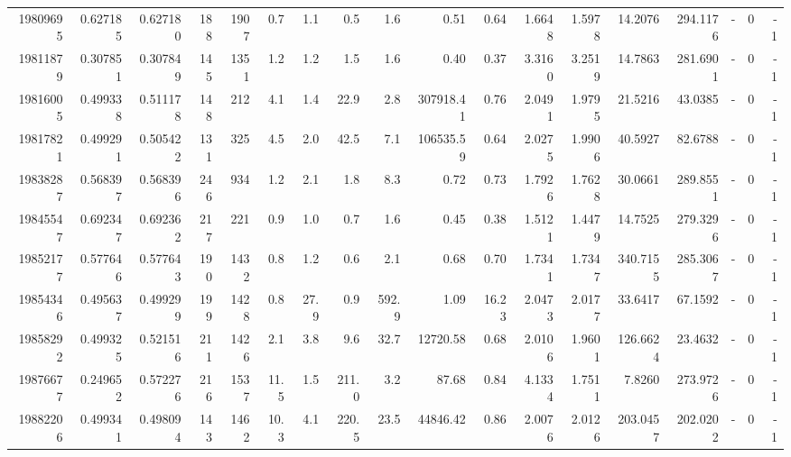 \begin{tabular}{rrrrrrrrrrrrrrrlrr}
  19809695 & 0.627185 &   0.627180 &  188 & 1907 &      0.7 &      1.1 &     0.5 &      1.6 &       0.51 &        0.64 &  1.6648 &  1.5978 &   14.2076 &  294.1176 &             - &        0 &         -1 \\
  19811879 & 0.307851 &   0.307849 &  145 & 1351 &      1.2 &      1.2 &     1.5 &      1.6 &       0.40 &        0.37 &  3.3160 &  3.2519 &   14.7863 &  281.6901 &             - &        0 &         -1 \\
  19816005 & 0.499338 &   0.511178 &  148 &  212 &      4.1 &      1.4 &    22.9 &      2.8 &  307918.41 &        0.76 &  2.0491 &  1.9795 &   21.5216 &   43.0385 &             - &        0 &         -1 \\
  19817821 & 0.499291 &   0.505422 &  131 &  325 &      4.5 &      2.0 &    42.5 &      7.1 &  106535.59 &        0.64 &  2.0275 &  1.9906 &   40.5927 &   82.6788 &             - &        0 &         -1 \\
  19838287 & 0.568397 &   0.568396 &  246 &  934 &      1.2 &      2.1 &     1.8 &      8.3 &       0.72 &        0.73 &  1.7926 &  1.7628 &   30.0661 &  289.8551 &             - &        0 &         -1 \\
  19845547 & 0.692347 &   0.692362 &  217 &  221 &      0.9 &      1.0 &     0.7 &      1.6 &       0.45 &        0.38 &  1.5121 &  1.4479 &   14.7525 &  279.3296 &             - &        0 &         -1 \\
  19852177 & 0.577646 &   0.577643 &  190 & 1432 &      0.8 &      1.2 &     0.6 &      2.1 &       0.68 &        0.70 &  1.7341 &  1.7347 &  340.7155 &  285.3067 &             - &        0 &         -1 \\
  19854346 & 0.495637 &   0.499299 &  199 & 1428 &      0.8 &     27.9 &     0.9 &    592.9 &       1.09 &       16.23 &  2.0473 &  2.0177 &   33.6417 &   67.1592 &             - &        0 &         -1 \\
  19858292 & 0.499325 &   0.521516 &  211 & 1426 &      2.1 &      3.8 &     9.6 &     32.7 &   12720.58 &        0.68 &  2.0106 &  1.9601 &  126.6624 &   23.4632 &             - &        0 &         -1 \\
  19876677 & 0.249652 &   0.572276 &  216 & 1537 &     11.5 &      1.5 &   211.0 &      3.2 &      87.68 &        0.84 &  4.1334 &  1.7511 &    7.8260 &  273.9726 &             - &        0 &         -1 \\
  19882206 & 0.499341 &   0.498094 &  143 & 1462 &     10.3 &      4.1 &   220.5 &     23.5 &   44846.42 &        0.86 &  2.0076 &  2.0126 &  203.0457 &  202.0202 &             - &        0 &         -1 \\

\end{tabular}
